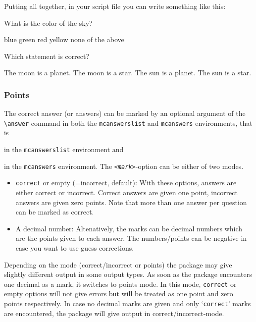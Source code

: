 \documentclass{article}
\begin{document}
Putting all together, in your script file you can write something like this:
\begin{code}
\question What is the color of the sky?
  \begin{mcanswerslist}[fixlast]
  \answer blue
  \answer green
  \answer red
  \answer yellow
  \answer none of the above
  \end{mcanswerslist}    
  
\question Which statement is correct?        
          \begin{mcanswerslist}[{1,2,3,4},{2,1,4,3}
                                ,{3,4,1,2},{4,3,2,1}]
          \answer The moon is a planet.
          \answer The moon is a star.
          \answer The sun is a planet.
          \answer The sun is a star.
          \end{mcanswerslist}
\end{code}





\subsubsection{Points}

The correct answer (or answers) can be marked by an optional argument of the \verb$\answer$ command in both the \verb$mcanswerslist$ and \verb$mcanswers$ environments, that is 
\begin{code}[commandchars=\!\?\;]
\end{code}
in the \verb$mcanswerslist$ environment and 
\begin{code}[commandchars=\!\?\;]
\end{code}
in the \verb$mcanswers$ environment. The \textit{\texttt{<mark>}}-option can be either of two modes.
\begin{itemize}
 \item \verb$correct$ or empty (=incorrect, default): 
       With these options, answers are either correct or incorrect. Correct answers are given one point, incorrect answers are given zero points. Note that more than one answer per question can be marked as correct.
 \item A decimal number:
       Altenatively, the marks can be decimal numbers which are the points given to each answer. The numbers/points can be negative in case you want to use guess corrections. 
\end{itemize}
Depending on the mode (correct/incorrect or points) the package may give slightly different output in some output types. As soon as the package encounters one decimal as a mark, it switches to points mode. In this mode, \verb$correct$ or empty options will not give errors but will be treated as one point and zero points respectively. In case no decimal marks are given and only `\verb$correct$' marks are encountered, the package will give output in correct/incorrect-mode.
\end{document}
